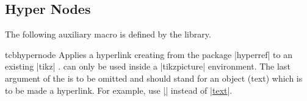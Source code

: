 \subsection{Hyper Nodes}
The following auxiliary macro is defined by the  library.
\enlargethispage*{1cm}

\begin{docCommand}[doc new and updated={2016-02-03}{2023-02-28}]{tcbhypernode}{}
  Applies a hyperlink creating  from the package |hyperref| \cite{rahtz:hyperref}
  to an existing |tikz| .  can only
  be used inside a |tikzpicture| environment.
  The last argument of the  is to be omitted and should stand
  for an object (text) which is to be made a hyperlink.
  For example, use  |\hyperref[name]| instead of |\hyperref[name]{text}|.

\begin{dispExample}
\end{dispExample}

\end{docCommand}

